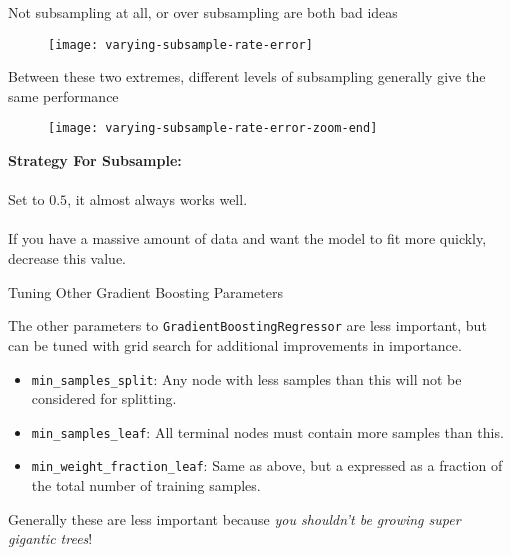 %
\begin{frame}
Not subsampling at all, or over subsampling are both bad ideas

  \begin{figure}
    \texttt{[image: varying-subsample-rate-error]}
  \end{figure}
 
\end{frame}
%
\begin{frame}
Between these two extremes, different levels of subsampling generally give the same performance

  \begin{figure}
    \texttt{[image: varying-subsample-rate-error-zoom-end]}
  \end{figure}
  
\end{frame}
%
\begin{frame}
\textbf{Strategy For Subsample:}\\~\\

Set to $0.5$, it almost always works well.\\~\\

If you have a massive amount of data and want the model to fit more quickly, decrease this value.
\end{frame}
%
\begin{frame}{Tuning Other Gradient Boosting Parameters}

The other parameters to \texttt{GradientBoostingRegressor} are less important, but can be tuned with grid search for additional improvements in importance.

\begin{itemize}
  \item \texttt{min\_samples\_split}: Any node with less samples than this will not be considered for splitting.
  \item \texttt{min\_samples\_leaf}: All terminal nodes must contain more samples than this.
  \item \texttt{min\_weight\_fraction\_leaf}: Same as above, but a expressed as a fraction of the total number of training samples.
\end{itemize}

\end{frame}
%
\begin{frame}
Generally these are less important because \textit{you shouldn't be growing super gigantic trees}!\\~\\


\end{frame}
